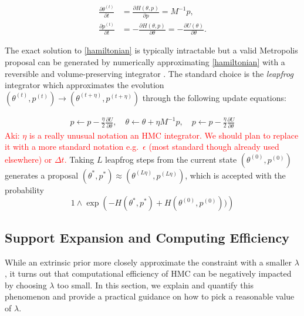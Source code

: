 \documentclass[10pt]{article}
\newcommand{\aki}[1]{\textcolor{red}{Aki: #1}}
\DeclareMathOperator{\1}{\mathbbm{1}}
\newcommand{\dt}{\eta} %
\newcommand{\mass}{M} %
\begin{document}
\begin{equation}
\begin{aligned}
\label{hamiltonian}
\frac{\partial \theta ^{(t)}}{\partial t} & =\frac{\partial H(\theta, p)}{\partial p} = \mass^{-1}p,\\
\frac{\partial p^{(t)}}{\partial t}& =-\frac{\partial H(\theta, p)}{\partial \theta} = -\frac{\partial U(\theta)}{\partial \theta}.
\end{aligned}
\end{equation}

The exact solution to \eqref{hamiltonian} is typically intractable but a valid Metropolis proposal can be generated by numerically approximating \eqref{hamiltonian} with a reversible and volume-preserving  integrator \citep{neal2011mcmc}. The standard choice is the \textit{leapfrog} integrator which approximates the evolution $(\theta^{(t)},p^{(t)}) \to (\theta^{(t + \dt)},p^{(t + \dt)})$ through the following update equations:

\begin{equation}
\begin{aligned}
\label{leap-frog}
p \leftarrow p - \frac{\dt}{2} \frac{\partial U}{\partial  \theta },\quad
\theta \leftarrow  \theta  + \dt \mass^{-1}p,\quad
p \leftarrow p -  \frac{\dt}{2}  \frac{\partial U}{\partial  \theta } 
\end{aligned}
\end{equation}
\aki{$\eta$ is a really unusual notation an HMC integrator. We should plan to replace it with a more standard notation e.g.\ $\epsilon$ (most standard though already used elsewhere) or $\Delta t$.}
Taking $L$ leapfrog steps from the current state $(\theta^{(0)},p^{(0)})$ generates a proposal $(\theta^{*},p^{*}) \approx (\theta^{(L \dt)},p^{(L \dt)})$, which is accepted with the probability 
$$1\wedge \exp  \left( - H(\theta^{*},p^{*}) + H(\theta^{(0)},p^{(0)}))\right)$$


\subsection{Support Expansion and Computing Efficiency}

While an extrinsic prior more closely approximate the constraint with a smaller $\lambda$, it turns out that computational efficiency of HMC can be negatively impacted by choosing $\lambda$ too small. In this section, we explain and quantify this phenomenon and provide a practical guidance on how to pick a reasonable value of $\lambda$.
\end{document}
